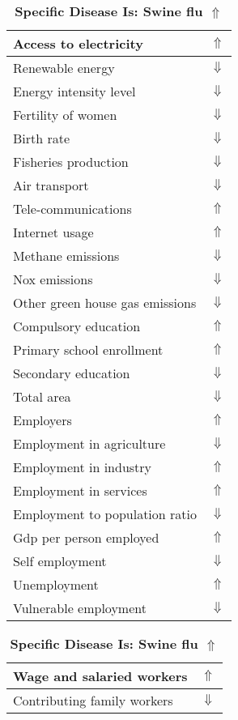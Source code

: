 \documentclass[12pt,notitlepage,oneside]{report}
\begin{document}
\clearpage
\begin{table}[!htb]
\caption{\textbf{Specific Disease Is: Swine flu $\Uparrow$}}
\centering
\label{Correlated Socio-economic Factors0}
\begin{tabular}{|l|l|}
\hline
Access to electricity & $\Uparrow$\\ \hline
Renewable energy & $\Downarrow$\\ \hline
Energy intensity level & $\Downarrow$\\ \hline
Fertility of women & $\Downarrow$\\ \hline
Birth rate & $\Downarrow$\\ \hline
Fisheries production & $\Downarrow$\\ \hline
Air transport  & $\Downarrow$\\ \hline
Tele-communications & $\Uparrow$\\ \hline
Internet usage & $\Uparrow$\\ \hline
Methane emissions & $\Downarrow$\\ \hline
Nox emissions & $\Downarrow$\\ \hline
Other green house gas emissions & $\Downarrow$\\ \hline
Compulsory education & $\Uparrow$\\ \hline
Primary school enrollment & $\Uparrow$\\ \hline
Secondary education & $\Downarrow$\\ \hline
Total area & $\Downarrow$\\ \hline
Employers & $\Uparrow$\\ \hline
Employment in agriculture & $\Downarrow$\\ \hline
Employment in industry & $\Uparrow$\\ \hline
Employment in services & $\Uparrow$\\ \hline
Employment to population ratio & $\Downarrow$\\ \hline
Gdp per person employed & $\Uparrow$\\ \hline
Self employment & $\Downarrow$\\ \hline
Unemployment & $\Uparrow$\\ \hline
Vulnerable employment & $\Downarrow$\\ \hline
\end{tabular}
\begin{tabular}{|l|l|}
\hline
Wage and salaried workers & $\Uparrow$\\ \hline
Contributing family workers & $\Downarrow$\\ \hline

\end{tabular}
\end{table}
\end{document}
